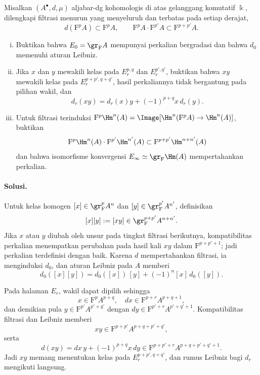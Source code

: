 Misalkan $(A^\bullet,d,\mu)$ aljabar-dg kohomologis di atas gelanggang
komutatif $\Bbbk$, dilengkapi filtrasi menurun yang menyeluruh dan terbatas
pada setiap derajat,
\[
	d(\mathrm{F}^pA)\subset\mathrm{F}^pA,
	\qquad
	\mathrm{F}^pA\cdot\mathrm{F}^{p'}A
	\subset\mathrm{F}^{p+p'}A.
\]
\begin{enumerate}[(i)]
	\item Buktikan bahwa $E_0=\gr_{\mathrm F}A$ mempunyai perkalian
bergradasi dan bahwa $d_0$ memenuhi aturan Leibniz.
	\item Jika $x$ dan $y$ mewakili kelas pada
$E_r^{p,q}$ dan $E_r^{p',q'}$, buktikan bahwa $xy$ mewakili kelas pada
$E_r^{p+p',q+q'}$, hasil perkaliannya tidak bergantung pada pilihan wakil, dan
	\[
		d_r(xy)=d_r(x)y+(-1)^{p+q}x\,d_r(y).
	\]
	\item Untuk filtrasi terinduksi
	$\mathrm{F}^p\Hm^n(A)=\Image[\Hm^n(\mathrm{F}^pA)\to\Hm^n(A)]$,
	buktikan
	\[
		\mathrm{F}^p\Hm^n(A)\cdot\mathrm{F}^{p'}\Hm^{n'}(A)
		\subset\mathrm{F}^{p+p'}\Hm^{n+n'}(A)
	\]
	dan bahwa isomorfisme konvergensi
	$E_\infty\simeq\gr_{\mathrm F}\Hm(A)$ mempertahankan perkalian.
\end{enumerate}

\paragraph{Solusi.}
\hypertarget{o014.mastery.derived-spectral.002.sol08}{ }
Untuk kelas homogen
$[x]\in\gr^p_{\mathrm F}A^n$ dan
$[y]\in\gr^{p'}_{\mathrm F}A^{n'}$, definisikan
\[
	[x][y]:=[xy]\in\gr^{p+p'}_{\mathrm F}A^{n+n'}.
\]
Jika $x$ atau $y$ diubah oleh unsur pada tingkat filtrasi berikutnya,
kompatibilitas perkalian menempatkan perubahan pada hasil kali $xy$ dalam
$\mathrm{F}^{p+p'+1}$; jadi perkalian terdefinisi dengan baik. Karena $d$
mempertahankan filtrasi, ia menginduksi $d_0$, dan aturan Leibniz pada $A$
memberi
\[
	d_0([x][y])=d_0([x])\,[y]+(-1)^n[x]\,d_0([y]).
\]

Pada halaman $E_r$, wakil dapat dipilih sehingga
\[
	x\in\mathrm{F}^pA^{p+q},\quad
	dx\in\mathrm{F}^{p+r}A^{p+q+1},
\]
dan demikian pula
$y\in\mathrm{F}^{p'}A^{p'+q'}$ dengan
$dy\in\mathrm{F}^{p'+r}A^{p'+q'+1}$. Kompatibilitas filtrasi dan Leibniz
memberi
\[
	xy\in\mathrm{F}^{p+p'}A^{p+q+p'+q'},
\]
serta
\[
	d(xy)=dx\,y+(-1)^{p+q}x\,dy
	\in\mathrm{F}^{p+p'+r}A^{p+q+p'+q'+1}.
\]
Jadi $xy$ memang menentukan kelas pada $E_r^{p+p',q+q'}$, dan rumus
Leibniz bagi $d_r$ mengikuti langsung.

